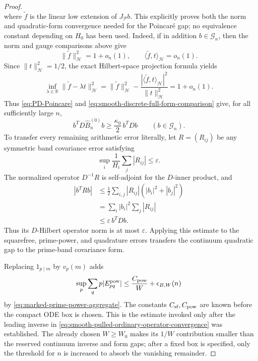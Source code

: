 \documentclass[11pt]{article}
\numberwithin{equation}{section}
\theoremstyle{definition}
\theoremstyle{remark}
\newcommand{\1}{\mathbf 1}
\begin{document}
\begin{proof}
\begin{equation}
\end{equation}
where \(\widetilde f\) is the linear low extension of
\(J_{\mathcal P}b\).  This explicitly proves both the norm and
quadratic-form convergence needed for the Poincar\'e gap; no equivalence
constant depending on \(H_0\) has been used.
Indeed, if in addition \(b\in\mathcal G_n\), then the norm and gauge
comparisons above give
\[
 \|\widetilde f\|_{\mathcal H}^2=1+o_n(1),\qquad
 \langle\widetilde f,t\rangle_{\mathcal H}=o_n(1).
\]
Since \(\|t\|_{\mathcal H}^2=1/2\), the exact Hilbert-space projection
formula yields
\[
 \inf_{\lambda\in\mathbb R}
 \|\widetilde f-\lambda t\|_{\mathcal H}^2
 =\|\widetilde f\|_{\mathcal H}^2
   -\frac{|\langle\widetilde f,t\rangle_{\mathcal H}|^2}
         {\|t\|_{\mathcal H}^2}
 =1+o_n(1).
\]
Thus \eqref{eq:PD-Poincare} and
\eqref{eq:smooth-discrete-full-form-comparison} give, for all
sufficiently large \(n\),
\begin{equation}
 b^TD\widehat B_n^{(0)}b\geq\frac{\kappa_0}{2}\,b^TDb
 \qquad(b\in\mathcal G_n).
 \label{eq:smooth-leading-arithmetic-form-gap}
\end{equation}
To transfer every remaining arithmetic error literally, let
\(R=(R_{ij})\) be any symmetric band covariance error satisfying
\[
 \sup_i\frac1{H_i}\sum_j|R_{ij}|\leq\varepsilon.
\]
The normalized operator \(D^{-1}R\) is self-adjoint for the
\(D\)-inner product, and
\begin{align*}
 |b^TRb|
 &\leq\frac12\sum_{i,j}|R_{ij}|(|b_i|^2+|b_j|^2)\\
 &=\sum_i|b_i|^2\sum_j|R_{ij}|\\
 &\leq\varepsilon\,b^TDb.
\end{align*}
Thus its \(D\)-Hilbert operator norm is at most \(\varepsilon\).
Applying this estimate to the squarefree, prime-power, and quadrature
errors transfers the continuum quadratic gap to the prime-band
covariance form.

Replacing \(1_{p\mid m}\) by \(v_p(m)\) adds
\begin{equation}
 \sup_p\sum_qp|E^{\rm pow}_{pq}|
 \le \frac{C_{\rm pow}}W+\epsilon_{B,W}(n)
 \label{eq:smooth-power-row-transfer}
\end{equation}
by \eqref{eq:marked-prime-power-aggregate}.  The constants
\(C_{\rm sf},C_{\rm pow}\) are known before the compact ODE box is
chosen.  This is the estimate invoked only after the leading inverse in
\eqref{eq:smooth-pulled-ordinary-operator-convergence} was established.
The already chosen \(W\geq W_0\) makes its \(1/W\) contribution smaller
than the reserved continuum inverse and form gaps; after a fixed box is
specified, only the threshold for \(n\) is increased to absorb the
vanishing remainder.


\end{proof}
\end{document}
